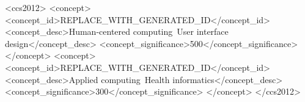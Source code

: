 \documentclass[manuscript, screen, review]{acmart}
\begin{document}
\begin{CCSXML}
<ccs2012>
 <concept>
  <concept_id>REPLACE_WITH_GENERATED_ID</concept_id>
  <concept_desc>Human-centered computing~User interface design</concept_desc>
  <concept_significance>500</concept_significance>
 </concept>
 <concept>
  <concept_id>REPLACE_WITH_GENERATED_ID</concept_id>
  <concept_desc>Applied computing~Health informatics</concept_desc>
  <concept_significance>300</concept_significance>
 </concept>
</ccs2012>
\end{CCSXML}




\maketitle

\end{document}
